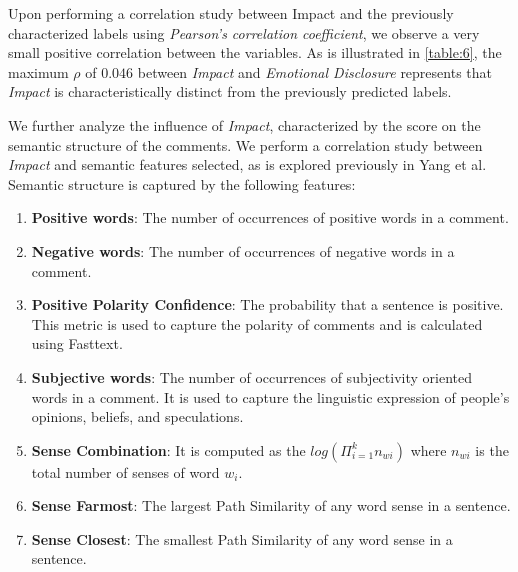 \documentclass[runningheads]{llncs}
\begin{document}
\begin{table}[]
\centering
{}
\caption{The relationship between Labels and Impact, as represented by Pearson correlation coefficient, $\rho$.}
\label{table:6}
\end{table}
Upon performing a correlation study between Impact and the previously characterized labels using \textit{Pearson’s correlation coefficient}\cite{Rodgers1988}, we observe a very small positive correlation between the variables. As is illustrated in \autoref{table:6}, the maximum $\rho$ of $0.046$ between \textit{Impact} and \textit{Emotional Disclosure} represents that \textit{Impact} is characteristically distinct from the previously predicted labels. 

We further analyze the influence of \textit{Impact}, characterized by the score on the semantic structure of the comments. We perform a correlation study between \textit{Impact} and semantic features selected, as is explored previously in Yang et al\cite{HumorRecognitionPaper}. Semantic structure is captured by the following features:  
\begin{enumerate}
    \item \textbf{Positive words}: The number of occurrences of positive words in a comment.
    \item \textbf{Negative words}: The number of occurrences of negative words in a comment.
    \item \textbf{Positive Polarity Confidence}: The probability that a sentence is positive. This metric is used to capture the polarity of comments and is calculated using Fasttext\cite{bojanowski2016enriching}.
    \item \textbf{Subjective words}: The number of occurrences of subjectivity oriented words in a comment. It is used to capture the linguistic expression of people’s opinions, beliefs, and speculations.
    \item \textbf{Sense Combination}: It is computed as the  $log( \Pi^{k}_{i=1} n_{wi} )$ where $n_{wi}$ is the total number of senses of word $w_{i}$.
    \item \textbf{Sense Farmost}: The largest Path Similarity of any word sense in a sentence.
    \item \textbf{Sense Closest}: The smallest Path Similarity of any word sense in a sentence.
\end{enumerate}
\end{document}
